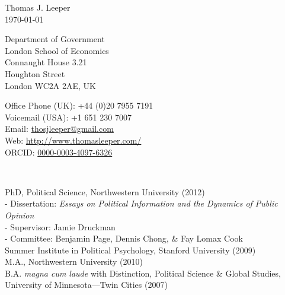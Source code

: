 \documentclass[12pt]{article}
\renewcommand{\section}[1]{\pagebreak[3]%
    \llap{\scshape\smash{\parbox[t]{\marginparwidth}{\raggedright {\color{lg}#1}}}}%
    \vspace{-\baselineskip}\par}
\newcommand{\entry}[1]{\indent {\color{lg}\guillemotright}\hspace{2pt}#1\vspace{.25em}\\}
\newcommand{\subentry}[1]{{\color{lg}-} #1\vspace{.25em}\\}
\begin{document}
{\LARGE Thomas J. Leeper}\\

\today\\

\begin{minipage}[b]{0.5\linewidth}
Department of Government\\
London School of Economics\\
Connaught House 3.21\\
Houghton Street\\
London WC2A 2AE, UK
\end{minipage}
\begin{minipage}[b]{0.5\linewidth}
Office Phone (UK): +44 (0)20 7955 7191\\
Voicemail (USA): +1 651 230 7007\\
Email: \href{mailto:thosjleeper@gmail.com}{thosjleeper@gmail.com}\\
Web: \href{http://www.thomasleeper.com/}{http://www.thomasleeper.com/}\\
ORCID: \href{http://orcid.org/0000-0003-4097-6326}{0000-0003-4097-6326}
\end{minipage}\\

\section{Education}
\entry{PhD, Political Science, Northwestern University (2012)}
	\subentry{Dissertation: \textit{Essays on Political Information and the Dynamics of Public Opinion}}
	\subentry{Supervisor: Jamie Druckman}
	\subentry{Committee: Benjamin Page, Dennis Chong, \& Fay Lomax Cook}
\entry{Summer Institute in Political Psychology, Stanford University (2009)}
\entry{M.A., Northwestern University (2010)}
\entry{B.A. \textit{magna cum laude} with Distinction, Political Science \& Global Studies, University of Minnesota---Twin Cities (2007)}
\end{document}
